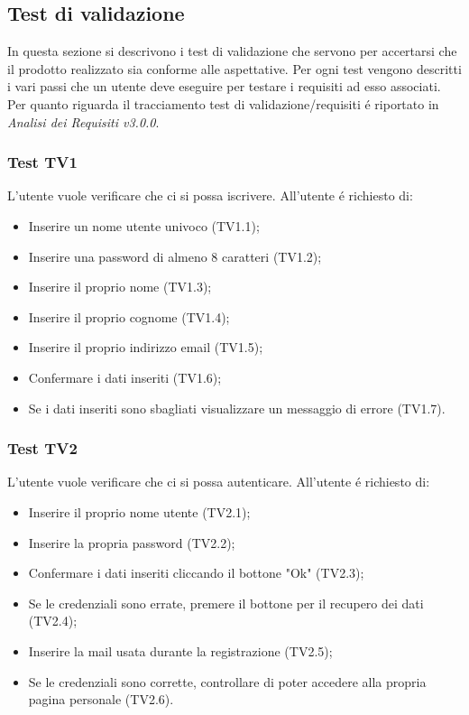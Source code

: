 \subsection{Test di validazione}
In questa sezione si descrivono i test di validazione che servono per accertarsi che il prodotto realizzato sia conforme alle aspettative.
Per ogni test vengono descritti i vari passi che un utente deve eseguire per testare i requisiti ad esso associati. Per quanto riguarda il tracciamento test di validazione/requisiti é riportato in \textit{Analisi dei Requisiti v3.0.0}.

\subsubsection{Test TV1}
L'utente vuole verificare che ci si possa iscrivere. \newline
All'utente é richiesto di:
\begin{itemize}
	\item Inserire un nome utente univoco (TV1.1);
	\item Inserire una password di almeno 8 caratteri (TV1.2);
	\item Inserire il proprio nome (TV1.3);
	\item Inserire il proprio cognome (TV1.4);
	\item Inserire il proprio indirizzo email (TV1.5);
	\item Confermare i dati inseriti (TV1.6);
	\item Se i dati inseriti sono sbagliati visualizzare un messaggio di errore (TV1.7).
\end{itemize}

\subsubsection{Test TV2}
L'utente vuole verificare che ci si possa autenticare. \newline
All'utente é richiesto di:
\begin{itemize}
	\item Inserire il proprio nome utente (TV2.1);
	\item Inserire la propria password (TV2.2);
	\item Confermare i dati inseriti cliccando il bottone "Ok" (TV2.3);
	\item Se le credenziali sono errate, premere il bottone per il recupero dei dati (TV2.4);
	\item Inserire la mail usata durante la registrazione (TV2.5);
	\item Se le credenziali sono corrette, controllare di poter accedere alla propria pagina personale (TV2.6).
\end{itemize}

